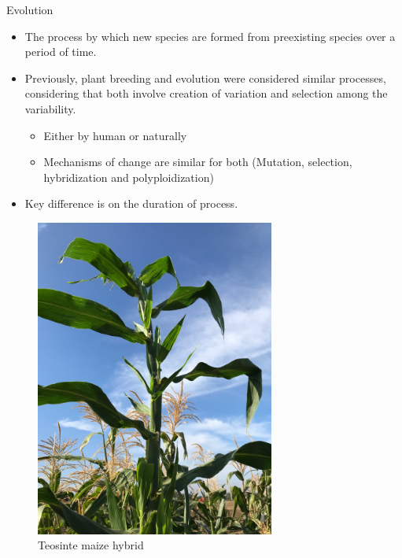 \documentclass[11pt,ignorenonframetext,aspectratio=169]{beamer}
\providecommand{\tightlist}{%
  \setlength{\itemsep}{0pt}\setlength{\parskip}{0pt}}
\begin{document}
\begin{frame}[standout]{Evolution}
\protect\hypertarget{evolution}{}
\begin{itemize}
\tightlist
\item
  The process by which new species are formed from preexisting species
  over a period of time.
\item
  Previously, plant breeding and evolution were considered similar
  processes, considering that both involve creation of variation and
  selection among the variability.

  \begin{itemize}
  \tightlist
  \item
    Either by human or naturally
  \item
    Mechanisms of change are similar for both (Mutation, selection,
    hybridization and polyploidization)
  \end{itemize}
\item
  Key difference is on the duration of process.
\end{itemize}
\end{frame}

\begin{frame}{}
\protect\hypertarget{section-3}{}
\begin{figure}

{\centering \includegraphics[width=0.7\textwidth, keepaspectratio,height=0.8\textheight]{./images/Teosinte_maize_hybrid_cross} 

}

\caption{Teosinte maize hybrid}\label{fig:unnamed-chunk-1}
\end{figure}
\end{frame}
\end{document}
